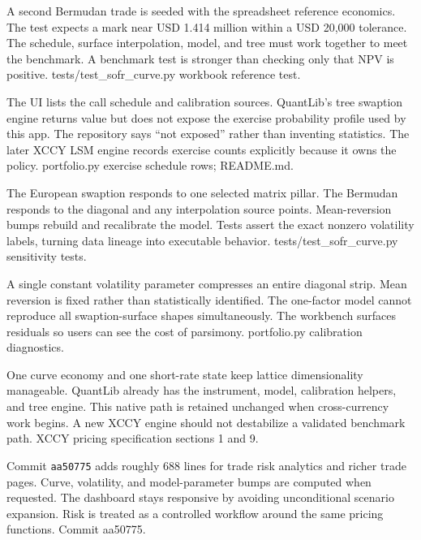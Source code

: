 {A second Bermudan trade is seeded with the spreadsheet reference economics.}
{The test expects a mark near USD 1.414 million within a USD 20,000 tolerance.}
{The schedule, surface interpolation, model, and tree must work together to meet the benchmark.}
{A benchmark test is stronger than checking only that NPV is positive.}
{tests/test\_sofr\_curve.py workbook reference test.}

{The UI lists the call schedule and calibration sources.}
{QuantLib's tree swaption engine returns value but does not expose the exercise probability profile used by this app.}
{The repository says ``not exposed'' rather than inventing statistics.}
{The later XCCY LSM engine records exercise counts explicitly because it owns the policy.}
{portfolio.py exercise schedule rows; README.md.}

{The European swaption responds to one selected matrix pillar.}
{The Bermudan responds to the diagonal and any interpolation source points.}
{Mean-reversion bumps rebuild and recalibrate the model.}
{Tests assert the exact nonzero volatility labels, turning data lineage into executable behavior.}
{tests/test\_sofr\_curve.py sensitivity tests.}

{A single constant volatility parameter compresses an entire diagonal strip.}
{Mean reversion is fixed rather than statistically identified.}
{The one-factor model cannot reproduce all swaption-surface shapes simultaneously.}
{The workbench surfaces residuals so users can see the cost of parsimony.}
{portfolio.py calibration diagnostics.}

{One curve economy and one short-rate state keep lattice dimensionality manageable.}
{QuantLib already has the instrument, model, calibration helpers, and tree engine.}
{This native path is retained unchanged when cross-currency work begins.}
{A new XCCY engine should not destabilize a validated benchmark path.}
{XCCY pricing specification sections 1 and 9.}

{Commit \texttt{aa50775} adds roughly 688 lines for trade risk analytics and richer trade pages.}
{Curve, volatility, and model-parameter bumps are computed when requested.}
{The dashboard stays responsive by avoiding unconditional scenario expansion.}
{Risk is treated as a controlled workflow around the same pricing functions.}
{Commit aa50775.}

